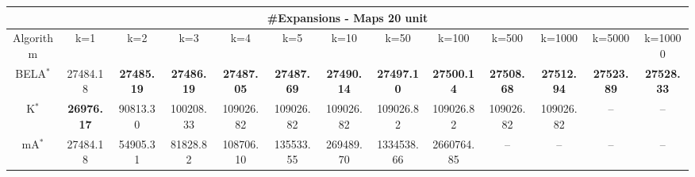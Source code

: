 \begin{tabular}{c|cccccccccccc}\toprule
\multicolumn{13}{c}{#Expansions - Maps 20 unit}\\ \midrule
Algorithm & k=1 & k=2 & k=3 & k=4 & k=5 & k=10 & k=50 & k=100 & k=500 & k=1000 & k=5000 & k=10000 \\ \midrule
BELA$^*$ & 27484.18 & \textbf{27485.19} & \textbf{27486.19} & \textbf{27487.05} & \textbf{27487.69} & \textbf{27490.14} & \textbf{27497.10} & \textbf{27500.14} & \textbf{27508.68} & \textbf{27512.94} & \textbf{27523.89} & \textbf{27528.33} \\
K$^*$ & \textbf{26976.17} & 90813.30 & 100208.33 & 109026.82 & 109026.82 & 109026.82 & 109026.82 & 109026.82 & 109026.82 & 109026.82 & -- & -- \\
mA$^*$ & 27484.18 & 54905.31 & 81828.82 & 108706.10 & 135533.55 & 269489.70 & 1334538.66 & 2660764.85 & -- & -- & -- & -- \\ \bottomrule 
\end{tabular}
